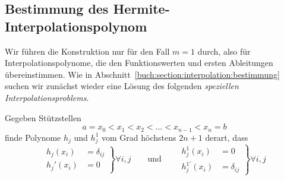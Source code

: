 %
%
\subsection{Bestimmung des Hermite-Interpolationspolynom
\label{buch:subsection:hermite:bestimmung}}
Wir führen die Konstruktion nur für den Fall $m=1$ durch, also für 
Interpolationspolynome, die den Funktionswerten und ersten Ableitungen
übereinstimmen.
Wie in Abschnitt~\ref{buch:section:interpolation:bestimmung} suchen
wir zunächst wieder eine Lösung des folgenden
{\em speziellen Interpolationsproblems}.

\begin{aufgabe}
%
%
Gegeben Stützstellen
\[
a=x_0<x_1<x_2<\dots < x_{n-1}<x_n=b
\]
finde Polynome $h_j$ und $h_j^1$ vom Grad höchstens $2n+1$ derart, dass
\[
\left.
\begin{aligned}
h_j(x_i)&=\delta_{ij}\\
h_j'(x_i)&=0
\end{aligned}\right\}\forall i,j
\qquad\text{und}\qquad
\left.
\begin{aligned}
h_j^1(x_i)&=0\\
h_j^{1\prime}(x_i)&=\delta_{ij}
\end{aligned}\right\}\forall i,j
\]
\end{aufgabe}

